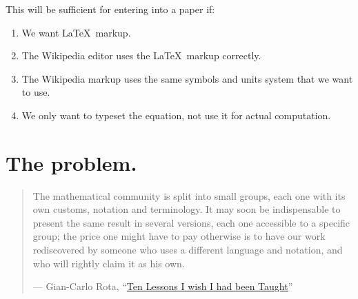 \documentclass[12pt,letterpaper]{article}
\begin{document}
This will be sufficient for entering into a paper if:
\begin{enumerate}
\item We want \LaTeX\ markup.
\item The Wikipedia editor uses the \LaTeX\ markup correctly.
\item The Wikipedia markup uses the same symbols and units system that we want to use.
\item We only want to typeset the equation, not use it for actual computation.
\end{enumerate}

\section{The problem.}

\begin{quote}
The mathematical community is split into small groups, each one with its own
customs, notation and terminology. It may soon be indispensable to present the
same result in several versions, each one accessible to a specific group; the
price one might have to pay otherwise is to have our work rediscovered by
someone who uses a different language and notation, and who will rightly claim
it as his own.

--- Gian-Carlo Rota,
``\href{http://alumni.media.mit.edu/~cahn/life/gian-carlo-rota-10-lessons.html#expository}
{Ten Lessons I wish I had been Taught}''
\end{quote}
\end{document}
